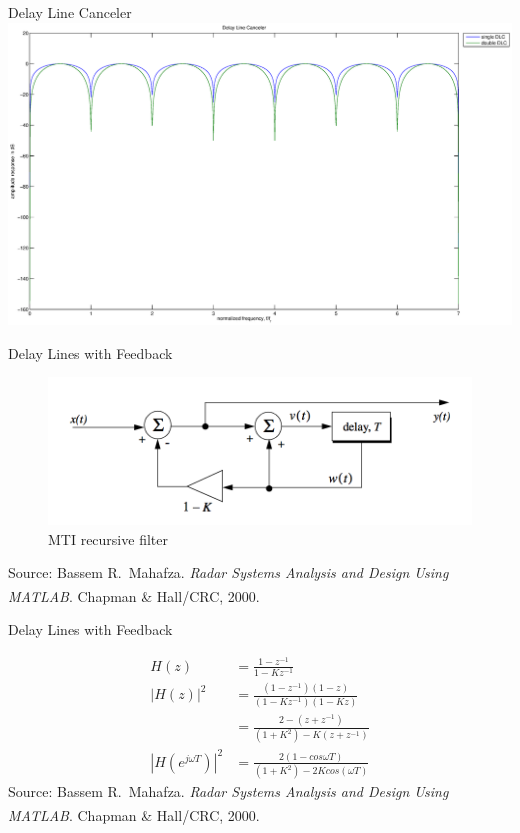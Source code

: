 \documentclass[mathserif]{beamer}
\begin{document}
    \begin{frame}{Delay Line Canceler}
    	\includegraphics[width=\linewidth]{delayLineCanceler}
    \end{frame}
    
    
    
    \begin{frame}{Delay Lines with Feedback}
      \begin{minipage}[t][0.8\textheight][t]{\textwidth}
	\begin{figure}[h]
		\centering
		\includegraphics[width=\linewidth]{feedbackDLC} 
		\caption{MTI recursive filter}
	\end{figure}
	\vfill
    	\tiny{Source: Bassem R.~Mahafza. \emph{Radar Systems Analysis and Design Using MATLAB\textsuperscript{\textregistered}}. Chapman \& Hall/CRC, 2000.}
      \end{minipage}
    \end{frame}
    
    
    
    \begin{frame}{Delay Lines with Feedback}
      \begin{minipage}[t][0.8\textheight][t]{\textwidth}
	\begin{align}
	  H(z) & = \frac{1 - z^{-1}}{1-Kz^{-1}} \nonumber \\
	  |H(z)|^2 & = \frac{(1-z^{-1})(1-z)}{(1-Kz^{-1})(1-Kz)} \nonumber \\
	  & = \frac{2-(z+z^{-1})}{(1+K^2)-K(z+z^{-1})} \nonumber \\
	  \left|{H(e^{j\omega T})}\right|^2 & = \frac{2(1-cos\omega T)}{(1+K^2)-2Kcos(\omega T)} \nonumber
	\end{align}
	\vfill
	\tiny{Source: Bassem R.~Mahafza. \emph{Radar Systems Analysis and Design Using MATLAB\textsuperscript{\textregistered}}. Chapman \& Hall/CRC, 2000.}
      \end{minipage}
    \end{frame}
    
\end{document}
